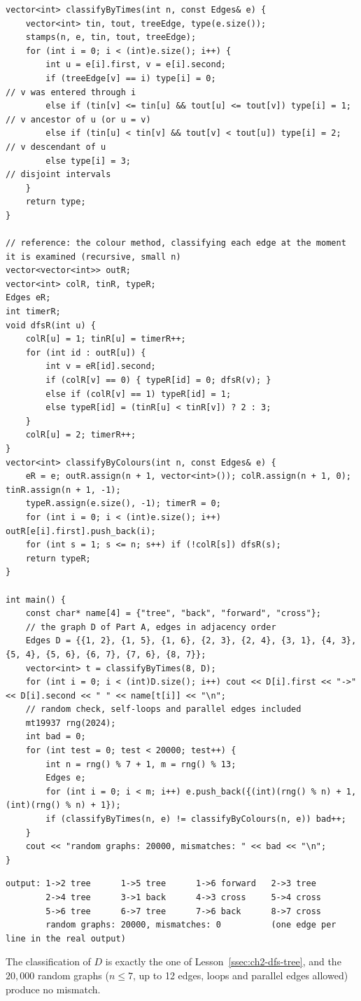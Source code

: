 \begin{solutionbox}
\begin{lstlisting}[style=cpp]
vector<int> classifyByTimes(int n, const Edges& e) {
    vector<int> tin, tout, treeEdge, type(e.size());
    stamps(n, e, tin, tout, treeEdge);
    for (int i = 0; i < (int)e.size(); i++) {
        int u = e[i].first, v = e[i].second;
        if (treeEdge[v] == i) type[i] = 0;                                  // v was entered through i
        else if (tin[v] <= tin[u] && tout[u] <= tout[v]) type[i] = 1;      // v ancestor of u (or u = v)
        else if (tin[u] < tin[v] && tout[v] < tout[u]) type[i] = 2;        // v descendant of u
        else type[i] = 3;                                                   // disjoint intervals
    }
    return type;
}

// reference: the colour method, classifying each edge at the moment it is examined (recursive, small n)
vector<vector<int>> outR;
vector<int> colR, tinR, typeR;
Edges eR;
int timerR;
void dfsR(int u) {
    colR[u] = 1; tinR[u] = timerR++;
    for (int id : outR[u]) {
        int v = eR[id].second;
        if (colR[v] == 0) { typeR[id] = 0; dfsR(v); }
        else if (colR[v] == 1) typeR[id] = 1;
        else typeR[id] = (tinR[u] < tinR[v]) ? 2 : 3;
    }
    colR[u] = 2; timerR++;
}
vector<int> classifyByColours(int n, const Edges& e) {
    eR = e; outR.assign(n + 1, vector<int>()); colR.assign(n + 1, 0); tinR.assign(n + 1, -1);
    typeR.assign(e.size(), -1); timerR = 0;
    for (int i = 0; i < (int)e.size(); i++) outR[e[i].first].push_back(i);
    for (int s = 1; s <= n; s++) if (!colR[s]) dfsR(s);
    return typeR;
}

int main() {
    const char* name[4] = {"tree", "back", "forward", "cross"};
    // the graph D of Part A, edges in adjacency order
    Edges D = {{1, 2}, {1, 5}, {1, 6}, {2, 3}, {2, 4}, {3, 1}, {4, 3}, {5, 4}, {5, 6}, {6, 7}, {7, 6}, {8, 7}};
    vector<int> t = classifyByTimes(8, D);
    for (int i = 0; i < (int)D.size(); i++) cout << D[i].first << "->" << D[i].second << " " << name[t[i]] << "\n";
    // random check, self-loops and parallel edges included
    mt19937 rng(2024);
    int bad = 0;
    for (int test = 0; test < 20000; test++) {
        int n = rng() % 7 + 1, m = rng() % 13;
        Edges e;
        for (int i = 0; i < m; i++) e.push_back({(int)(rng() % n) + 1, (int)(rng() % n) + 1});
        if (classifyByTimes(n, e) != classifyByColours(n, e)) bad++;
    }
    cout << "random graphs: 20000, mismatches: " << bad << "\n";
}
\end{lstlisting}
\begin{lstlisting}[style=trace]
output: 1->2 tree      1->5 tree      1->6 forward   2->3 tree
        2->4 tree      3->1 back      4->3 cross     5->4 cross
        5->6 tree      6->7 tree      7->6 back      8->7 cross
        random graphs: 20000, mismatches: 0          (one edge per line in the real output)
\end{lstlisting}
The classification of $D$ is exactly the one of Lesson~\ref{ssec:ch2-dfs-tree}, and the $20{,}000$ random graphs ($n \le 7$, up to 12 edges, loops and parallel edges allowed) produce no mismatch.
\end{solutionbox}

